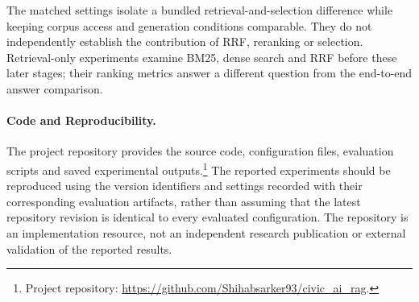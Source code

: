 The matched settings isolate a bundled retrieval-and-selection difference while keeping corpus access and generation conditions comparable. They do not independently establish the contribution of RRF, reranking or selection. Retrieval-only experiments examine BM25, dense search and RRF before these later stages; their ranking metrics answer a different question from the end-to-end answer comparison.

\paragraph{Code and Reproducibility.}
The project repository provides the source code, configuration files, evaluation scripts and saved experimental outputs.\footnote{Project repository: \url{https://github.com/Shihabsarker93/civic_ai_rag}.} The reported experiments should be reproduced using the version identifiers and settings recorded with their corresponding evaluation artifacts, rather than assuming that the latest repository revision is identical to every evaluated configuration. The repository is an implementation resource, not an independent research publication or external validation of the reported results.
